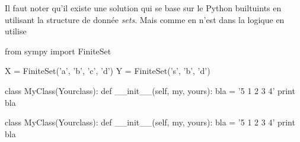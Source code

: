 \begin{solution}
Il faut noter qu'il existe une solution qui se base sur le Python builtuints en utilisant la structure de donnée \textit{sets}. Mais comme en n'est dans la logique en utilise 
\begin{python}
from sympy import FiniteSet

X = FiniteSet('a', 'b', 'c', 'd')
Y = FiniteSet('s', 'b', 'd')

class MyClass(Yourclass):
    def __init__(self, my, yours):
        bla = '5 1 2 3 4'
        print bla
\end{python}
\begin{python}
class MyClass(Yourclass):
    def __init__(self, my, yours):
        bla = '5 1 2 3 4'
        print bla
\end{python}

\end{solution}
